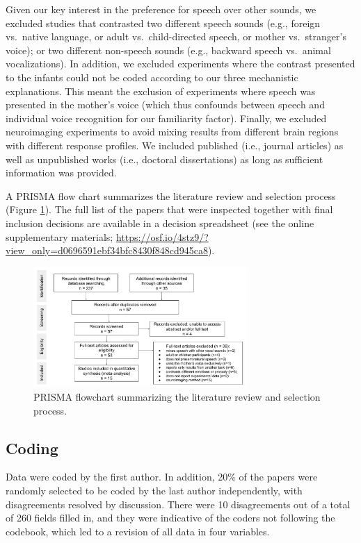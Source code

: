 \documentclass[
  english,
  man]{apa6}
\begin{document}
Given our key interest in the preference for speech over other sounds, we excluded studies that contrasted two different speech sounds (e.g., foreign vs.~native language, or adult vs.~child-directed speech, or mother vs.~stranger's voice); or two different non-speech sounds (e.g., backward speech vs.~animal vocalizations). In addition, we excluded experiments where the contrast presented to the infants could not be coded according to our three mechanistic explanations. This meant the exclusion of experiments where speech was presented in the mother's voice (which thus confounds between speech and individual voice recognition for our familiarity factor). Finally, we excluded neuroimaging experiments to avoid mixing results from different brain regions with different response profiles. We included published (i.e., journal articles) as well as unpublished works (i.e., doctoral dissertations) as long as sufficient information was provided.

A PRISMA flow chart summarizes the literature review and selection process (Figure \ref{fig:prisma}). The full list of the papers that were inspected together with final inclusion decisions are available in a decision spreadsheet (see the online supplementary materials; \url{https://osf.io/4stz9/?view_only=d0696591ebf34bfc8430f848cd945ca8}).

\begin{figure}
\includegraphics[width=3.2in]{figures_intro/PRISMA} \caption{PRISMA flowchart summarizing the literature review and selection process.}\label{fig:prisma}
\end{figure}

\hypertarget{coding}{%
\subsection{Coding}\label{coding}}

Data were coded by the first author. In addition, 20\% of the papers were randomly selected to be coded by the last author independently, with disagreements resolved by discussion. There were 10 disagreements out of a total of 260 fields filled in, and they were indicative of the coders not following the codebook, which led to a revision of all data in four variables.
\end{document}
